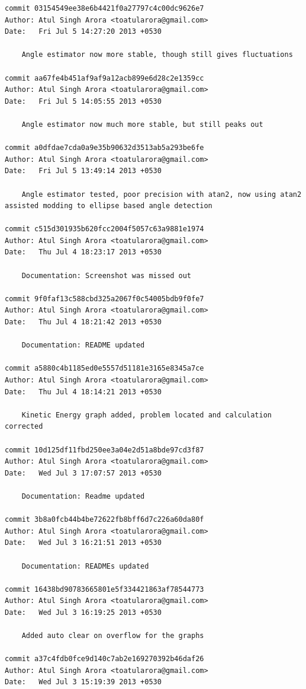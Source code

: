 \begin{lstlisting}
commit 03154549ee38e6b4421f0a27797c4c00dc9626e7
Author: Atul Singh Arora <toatularora@gmail.com>
Date:   Fri Jul 5 14:27:20 2013 +0530

    Angle estimator now more stable, though still gives fluctuations

commit aa67fe4b451af9af9a12acb899e6d28c2e1359cc
Author: Atul Singh Arora <toatularora@gmail.com>
Date:   Fri Jul 5 14:05:55 2013 +0530

    Angle estimator now much more stable, but still peaks out

commit a0dfdae7cda0a9e35b90632d3513ab5a293be6fe
Author: Atul Singh Arora <toatularora@gmail.com>
Date:   Fri Jul 5 13:49:14 2013 +0530

    Angle estimator tested, poor precision with atan2, now using atan2 assisted modding to ellipse based angle detection

commit c515d301935b620fcc2004f5057c63a9881e1974
Author: Atul Singh Arora <toatularora@gmail.com>
Date:   Thu Jul 4 18:23:17 2013 +0530

    Documentation: Screenshot was missed out

commit 9f0faf13c588cbd325a2067f0c54005bdb9f0fe7
Author: Atul Singh Arora <toatularora@gmail.com>
Date:   Thu Jul 4 18:21:42 2013 +0530

    Documentation: README updated

commit a5880c4b1185ed0e5557d51181e3165e8345a7ce
Author: Atul Singh Arora <toatularora@gmail.com>
Date:   Thu Jul 4 18:14:21 2013 +0530

    Kinetic Energy graph added, problem located and calculation corrected

commit 10d125df11fbd250ee3a04e2d51a8bde97cd3f87
Author: Atul Singh Arora <toatularora@gmail.com>
Date:   Wed Jul 3 17:07:57 2013 +0530

    Documentation: Readme updated

commit 3b8a0fcb44b4be72622fb8bff6d7c226a60da80f
Author: Atul Singh Arora <toatularora@gmail.com>
Date:   Wed Jul 3 16:21:51 2013 +0530

    Documentation: READMEs updated

commit 16438bd90783665801e5f334421863af78544773
Author: Atul Singh Arora <toatularora@gmail.com>
Date:   Wed Jul 3 16:19:25 2013 +0530

    Added auto clear on overflow for the graphs

commit a37c4fdb0fce9d140c7ab2e169270392b46daf26
Author: Atul Singh Arora <toatularora@gmail.com>
Date:   Wed Jul 3 15:19:39 2013 +0530


\end{lstlisting}
